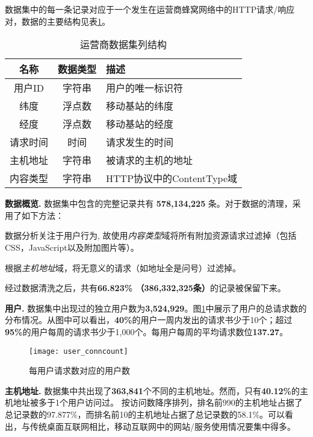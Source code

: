 数据集中的每一条记录对应于一个发生在运营商蜂窝网络中的HTTP请求/响应对，数据的主要结构见表\ref{interest:tab:fields}。

\begin{table}
\centering
\caption{运营商数据集列结构}
\label{interest:tab:fields}
\begin{tabular}{|c|c|l|} \hline
名称 & 数据类型 & 描述\\ \hline
用户ID & 字符串 & 用户的唯一标识符\\ \hline
纬度 & 浮点数 & 移动基站的纬度\\ \hline
经度 & 浮点数 & 移动基站的经度\\ \hline
请求时间 & 时间 & 请求发生的时间\\ \hline
主机地址 & 字符串 & 被请求的主机的地址\\ \hline
内容类型 & 字符串 & HTTP协议中的ContentType域 \\
\hline\end{tabular}
\end{table}

\textbf{数据概览.} 数据集中包含的完整记录共有 \textbf{578,134,225} 条。对于数据的清理，采用了如下方法：
\begin{inparaenum}[\itshape 1\upshape)]
\item 数据分析关注于用户行为, 故使用\textit{内容类型}域将所有附加资源请求过滤掉（包括CSS，JavaScript以及附加图片等）。
\item 根据\textit{主机地址}域，将无意义的请求（如地址全是问号）过滤掉。
\end{inparaenum}
经过数据清洗之后，共有\textbf{66.823\% （386,332,325条）}的记录被保留下来。

\textbf{用户.} 数据集中出现过的独立用户数为\textbf{3,524,929}。图\ref{interest:fig:usertotalcountdist}中展示了用户的总请求数的分布情况。从图中可以看出，\textbf{40\%}的用户一周内发出的请求书少于10个；超过\textbf{95\%}的用户每周的请求书少于1,000个。每用户每周的平均请求数位\textbf{137.27}。

\begin{figure}
\centering
\texttt{[image: user\_conncount]}
\caption{每用户请求数对应的用户数}
\label{interest:fig:usertotalcountdist}
\end{figure}

\textbf{主机地址.} 数据集中共出现了\textbf{363,841}个不同的主机地址。然而，只有\textbf{40.12\%}的主机地址被多于1个用户访问过。 按访问数降序排列，排名前990的主机地址占据了总记录数的97.877\%，而排名前10的主机地址占据了总记录数的58.1\%。可以看出，与传统桌面互联网相比，移动互联网中的网站/服务使用情况要集中得多。

